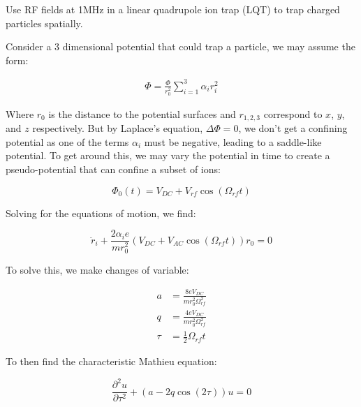 Use RF fields at 1MHz in a linear quadrupole ion trap (LQT) to trap charged particles spatially.

Consider a 3 dimensional potential that could trap a particle, we may assume the form:

\begin{align*}
	\Phi = \frac{\Phi}{r_0^2} \sum_{i=1}^3 \alpha_i r_i^2
\end{align*}

Where $r_0$ is the distance to the potential surfaces and $r_{1,2,3}$ correspond to $x$, $y$, and $z$ respectively. But by Laplace's equation, $\Delta \Phi = 0$, we don't get a confining potential as one of the terms $\alpha_i$ must be negative, leading to a saddle-like potential. To get around this, we may vary the potential in time to create a pseudo-potential that can confine a subset of ions:

\begin{equation*}
	\Phi_0(t) = V_{DC} + V_{rf} \cos(\Omega_{rf} t)
\end{equation*}

Solving for the equations of motion, we find:

\begin{equation}
	\ddot{r}_i + \frac{2 \alpha_i e}{m r_0^2}(V_{DC} + V_{AC} \cos(\Omega_{rf} t))r_0 = 0
\end{equation}

To solve this, we make changes of variable:

\begin{align}
	a & = \frac{8eV_{DC}}{mr_0^2\Omega_{rf}^2} \label{eq: a param} \\
	q & = \frac{4eV_{DC}}{mr_0^2\Omega_{rf}^2} \label{eq: q param} \\
	\tau & = \frac{1}{2}\Omega_{rf} t \nonumber
\end{align}

To then find the characteristic Mathieu equation:

\begin{equation}
	\frac{\partial^2 u}{\partial \tau^2} + (a - 2q \cos(2 \tau))u = 0
	\label{eq: Mathieu diffeq}
\end{equation}

%
%

